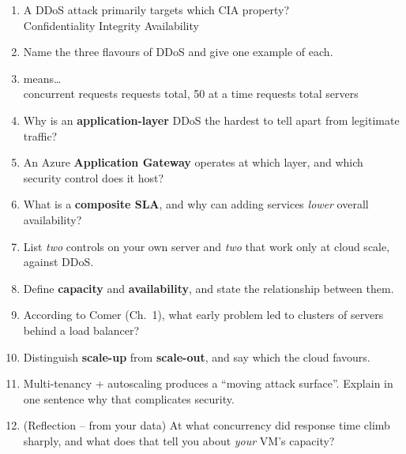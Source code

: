 \documentclass[11pt]{article}
\begin{document}
\begin{enumerate}
\item A DDoS attack primarily targets which CIA property?\\
      \cbox Confidentiality \quad \cbox Integrity \quad \cbox Availability
\item Name the three flavours of DDoS and give one example of each.
\item {} means\dots\\
       concurrent requests \quad {} requests total, 50 at a time \quad
       requests total \quad {} servers
\item Why is an \textbf{application-layer} DDoS the hardest to tell apart from legitimate traffic?
\item An Azure \textbf{Application Gateway} operates at which layer, and which security control does it
      host?
\item What is a \textbf{composite SLA}, and why can adding services \emph{lower} overall availability?
\item List \emph{two} controls on your own server and \emph{two} that work only at cloud scale,
      against DDoS.
\item Define \textbf{capacity} and \textbf{availability}, and state the relationship between them.
\item According to Comer (Ch.~1), what early problem led to clusters of servers behind a load
      balancer?
\item Distinguish \textbf{scale-up} from \textbf{scale-out}, and say which the cloud favours.
\item Multi-tenancy + autoscaling produces a ``moving attack surface''. Explain in one sentence why
      that complicates security.
\item (Reflection -- from your data) At what concurrency did response time climb sharply, and what does
      that tell you about \emph{your} VM's capacity?
\end{enumerate}
\end{document}
